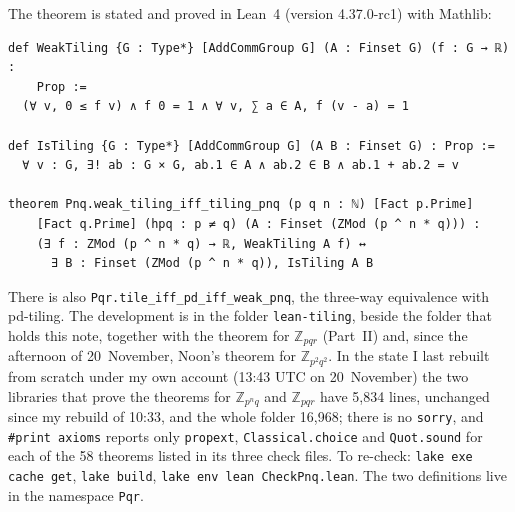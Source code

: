 \documentclass[11pt,a4paper]{amsart}
\theoremstyle{definition}
\theoremstyle{remark}
\newcommand{\Z}{\mathbb{Z}}
\newcommand{\lean}[1]{\texttt{#1}}
\begin{document}
The theorem is stated and proved in Lean~4 (version 4.37.0-rc1) with Mathlib:
\begin{verbatim}
def WeakTiling {G : Type*} [AddCommGroup G] (A : Finset G) (f : G → ℝ) :
    Prop :=
  (∀ v, 0 ≤ f v) ∧ f 0 = 1 ∧ ∀ v, ∑ a ∈ A, f (v - a) = 1

def IsTiling {G : Type*} [AddCommGroup G] (A B : Finset G) : Prop :=
  ∀ v : G, ∃! ab : G × G, ab.1 ∈ A ∧ ab.2 ∈ B ∧ ab.1 + ab.2 = v

theorem Pnq.weak_tiling_iff_tiling_pnq (p q n : ℕ) [Fact p.Prime]
    [Fact q.Prime] (hpq : p ≠ q) (A : Finset (ZMod (p ^ n * q))) :
    (∃ f : ZMod (p ^ n * q) → ℝ, WeakTiling A f) ↔
      ∃ B : Finset (ZMod (p ^ n * q)), IsTiling A B
\end{verbatim}
There is also \lean{Pqr.tile\_iff\_pd\_iff\_weak\_pnq}, the three-way equivalence with pd-tiling. The
development is in the folder \lean{lean-tiling}, beside the folder that holds this note, together with the theorem for
$\Z_{pqr}$ (Part~II) and, since the afternoon of 20~November, Noon's theorem for $\Z_{p^2q^2}$. In the state I last
rebuilt from scratch under my own account (13:43 UTC on 20~November) the two libraries that prove the theorems for
$\Z_{p^nq}$ and $\Z_{pqr}$ have 5{,}834 lines, unchanged since my rebuild of 10:33, and the whole folder
16{,}968; there is no \lean{sorry}, and
\lean{\#print axioms} reports only \lean{propext}, \lean{Classical.choice} and \lean{Quot.sound} for each of the
58 theorems listed in its three check files. To re-check: \lean{lake exe cache get}, \lean{lake build},
\lean{lake env lean CheckPnq.lean}. The two definitions live in the namespace \lean{Pqr}.
\end{document}
